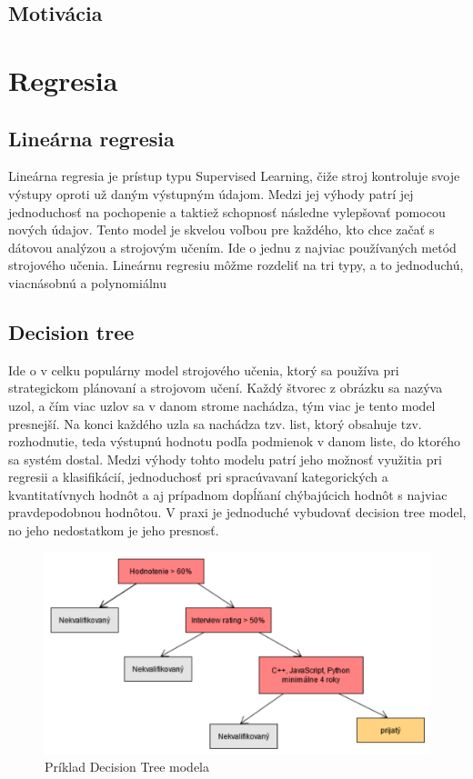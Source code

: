 \documentclass[8pt,oneside,slovak,a4paper]{article}
\begin{document}
\subsection{Motivácia} \label{motivacia}
\newpage
\section{Regresia} 
\subsection{Lineárna regresia}
Lineárna regresia je prístup typu Supervised Learning, čiže stroj kontroluje svoje výstupy oproti už daným výstupným údajom. Medzi jej výhody patrí jej jednoduchosť na pochopenie a taktiež schopnosť následne vylepšovať pomocou nových údajov. Tento model je skvelou voľbou pre každého, kto chce začať s dátovou analýzou a strojovým učením. \cite{quick_review}
\newline \hspace*{0.4cm} Ide o jednu z najviac používaných metód strojového učenia. Lineárnu regresiu môžme rozdeliť na tri typy, a to jednoduchú, viacnásobnú a polynomiálnu
\subsection{Decision tree}
Ide o v celku populárny model strojového učenia, ktorý sa používa pri strategickom plánovaní a strojovom učení. Každý štvorec z obrázku sa nazýva uzol, a čím viac uzlov sa v danom strome nachádza, tým viac je tento model presnejší.  Na konci každého uzla sa nachádza tzv. list, ktorý obsahuje tzv. rozhodnutie, teda výstupnú hodnotu podľa podmienok v danom liste, do ktorého sa systém dostal. 
\newline \hspace*{0.4cm} Medzi výhody tohto modelu patrí jeho možnosť využitia pri regresii a klasifikácií, jednoduchosť pri spracúvavaní kategorických a kvantitatívnych hodnôt a aj prípadnom dopĺňaní chýbajúcich hodnôt s najviac pravdepodobnou hodnôtou.
V praxi je jednoduché vybudovať decision tree model, no jeho nedostatkom je jeho presnosť. \cite{quick_review}
\begin{figure}[h]
\centering
\includegraphics[scale=0.55]{decision_tree}
\caption{Príklad Decision Tree modela}
\end{figure}
\newpage
\end{document}
